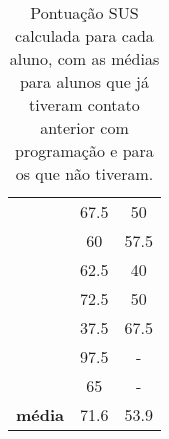 \begin{table}[h!]
\begin{tabular}{c|c|c|}
                                     & 67.5                                                                                           & 50                                                                                              \\ \cline{2-3} 
                                     & 60                                                                                             & 57.5                                                                                            \\ \cline{2-3} 
                                     & 62.5                                                                                           & 40                                                                                              \\ \cline{2-3} 
                                     & 72.5                                                                                           & 50                                                                                              \\ \cline{2-3} 
                                     & 37.5                                                                                           & 67.5                                                                                            \\ \cline{2-3} 
                                     & 97.5                                                                                           & -                                                                                               \\ \cline{2-3} 
                                     & 65                                                                                             & -                                                                                               \\ \hline
\multicolumn{1}{|c|}{\textbf{média}} & 71.6                                                                                           & 53.9                                                                                            \\ \hline
\end{tabular}
\caption{Pontuação SUS calculada para cada aluno, com as médias para alunos que já tiveram contato anterior com programação e para os que não tiveram.}
\label{table:sus_score}
\end{table}

